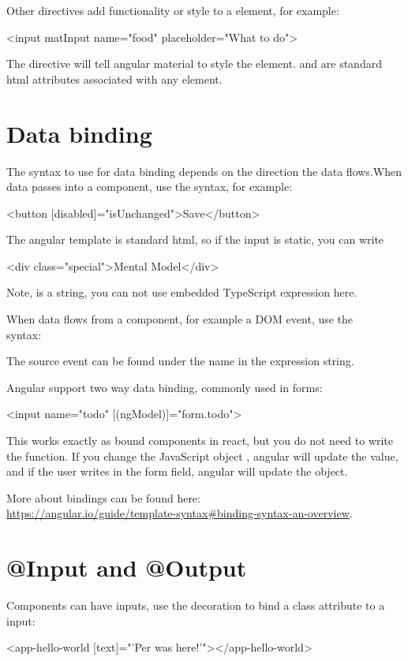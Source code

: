 \begin{itemize}
Other directives add functionality or style to a element, for example:
\begin{Code}
<input matInput name="food" placeholder="What to do">
\end{Code}
The  directive will tell angular material to style the  element.  and  are standard html attributes associated with any  element. 

\section{Data binding}
The syntax to use for data binding depends on the direction the data flows.When data passes into a component, use the  syntax, for example:
\begin{Code}
<button [disabled]="isUnchanged">Save</button>
\end{Code}
The angular template is standard html, so if the input is static, you can write
\begin{Code}
<div class="special">Mental Model</div>
\end{Code}
Note,  is a string, you can not use embedded TypeScript expression here. 

When data flows from a component, for example a DOM event, use the\\  syntax:
The source event can be found under the name  in the expression string.

Angular support two way data binding, commonly used in forms:
\begin{Code}
<input name="todo" [(ngModel)]="form.todo">
\end{Code}
This works exactly as bound components in react, but you do not need to write the  function. If you change the JavaScript object , angular will update the  value, and if the user writes in the form field, angular will update the  object.

More about bindings can be found here:\\ \url{https://angular.io/guide/template-syntax#binding-syntax-an-overview}.
\section{@Input and @Output}
Components can have inputs, use the  decoration to bind a class attribute to a input:
\begin{Code}
@Component({
  selector: 'app-hello-world',
  template: `
    <h3>Hello World</h3>
    <p> {{text}}
  `
})
export class HeroChildComponent {
  @Input() text: string;
\end{Code}
\begin{Code}
<app-hello-world [text]="'Per was here!'"></app-hello-world>
\end{Code}


\end{itemize}
